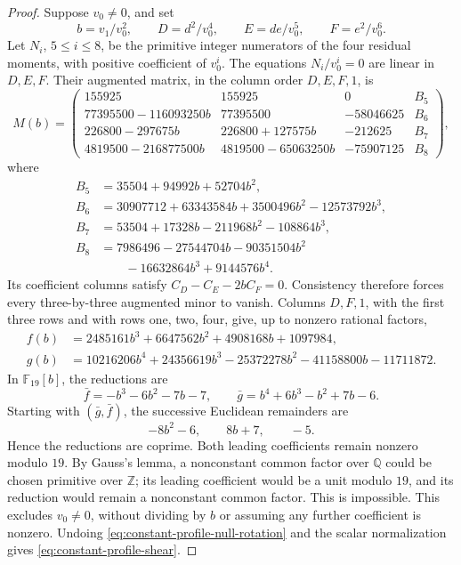 \begin{proof}
Suppose \(v_0\ne0\), and set
\[
 b=v_1/v_0^2,\qquad D=d^2/v_0^4,\qquad E=de/v_0^5,\qquad F=e^2/v_0^6.
\]
Let \(N_i\), \(5\le i\le8\), be the primitive integer numerators of
the four residual moments, with positive coefficient of \(v_0^i\).
The equations \(N_i/v_0^i=0\) are linear in \(D,E,F\). Their augmented
matrix, in the column order \(D,E,F,1\), is
\begin{equation}
 M(b)=\begin{pmatrix}
 155925&155925&0&B_5\\
 77395500-116093250b&77395500&-58046625&B_6\\
 226800-297675b&226800+127575b&-212625&B_7\\
 4819500-216877500b&4819500-65063250b&-75907125&B_8
 \end{pmatrix},
 \label{eq:constant-profile-matrix}
\end{equation}
where
\begin{align*}
 B_5&=35504+94992b+52704b^2,\\
 B_6&=30907712+63343584b+3500496b^2-12573792b^3,\\
 B_7&=53504+17328b-211968b^2-108864b^3,\\
 B_8&=7986496-27544704b-90351504b^2\\
    &\qquad{}-16632864b^3+9144576b^4.
\end{align*}
Its coefficient columns satisfy \(C_D-C_E-2bC_F=0\). Consistency
therefore forces every three-by-three augmented minor to vanish.
Columns \(D,F,1\), with the first three rows and with rows one, two,
four, give, up to nonzero rational factors,
\begin{align*}
 f(b)&=2485161b^3+6647562b^2+4908168b+1097984,\\
 g(b)&=10216206b^4+24356619b^3-25372278b^2-41158800b-11711872.
\end{align*}
In \(\mathbb F_{19}[b]\), the reductions are
\[
 \bar f=-b^3-6b^2-7b-7,\qquad
 \bar g=b^4+6b^3-b^2+7b-6.
\]
Starting with \((\bar g,\bar f)\), the successive Euclidean remainders are
\[
 -8b^2-6,\qquad 8b+7,\qquad -5.
\]
Hence the reductions are coprime. Both leading coefficients remain
nonzero modulo \(19\). By Gauss's lemma, a nonconstant common factor
over \(\mathbb Q\) could be chosen primitive over \(\mathbb Z\); its
leading coefficient would be a unit modulo \(19\), and its reduction
would remain a nonconstant common factor. This is impossible.
This excludes \(v_0\ne0\), without dividing by \(b\)
or assuming any further coefficient is nonzero. Undoing
\eqref{eq:constant-profile-null-rotation} and the scalar normalization
gives \eqref{eq:constant-profile-shear}.

\end{proof}

